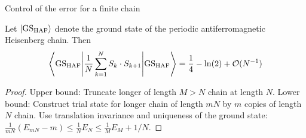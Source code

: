 \documentclass{beamer}[10]
\renewcommand{\braket}[1]{\left\langle#1\right\rangle}
\begin{document}
\begin{frame}
	Control of the error for a finite chain
	\begin{lemma}\label{LemmaHeisenbergChainFiniteNEstimate}
		Let $ \ket{\textnormal{GS}_{\textnormal{HAF}}} $ denote the ground state of the periodic antiferromagnetic Heisenberg chain. Then\begin{equation}
			\braket{\textnormal{GS}_{\textnormal{HAF}}\Bigg\vert\frac{1}{N}\sum_{k=1}^N S_k\cdot S_{k+1} \Bigg\vert \textnormal{GS}_{\textnormal{HAF}}}=\frac{1}{4}-\ln(2) +\mathcal{O}(N^{-1})
		\end{equation}
	\end{lemma}
\begin{proof}
	Upper bound: Truncate longer of length $M>N$ chain at length $N$.
	Lower bound: Construct trial state for longer chain of length $mN$ by $m$ copies of length $N$ chain. Use translation invariance and uniqueness of the ground state:
	$\frac{1}{mN}(E_{mN}-m)\leq\frac1N E_N\leq \frac{1}{M}E_M+1/N$.
\end{proof}
\end{frame}
\end{document}
